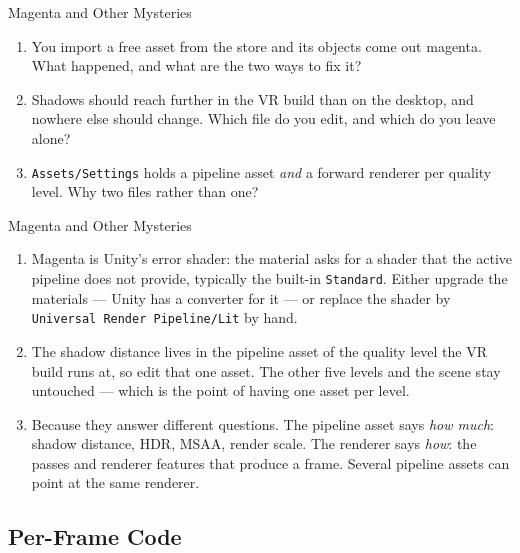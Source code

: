\begin{exerciseframe}{Magenta and Other Mysteries}
  \begin{enumerate}
    \item You import a free asset from the store and its objects come out
      magenta. What happened, and what are the two ways to fix it?
    \item Shadows should reach further in the VR build than on the desktop,
      and nowhere else should change. Which file do you edit, and which do you
      leave alone?
    \item \texttt{Assets/Settings} holds a pipeline asset \emph{and} a forward
      renderer per quality level. Why two files rather than one?
  \end{enumerate}
\end{exerciseframe}

\begin{solutionframe}{Magenta and Other Mysteries}
  \begin{enumerate}
    \item Magenta is Unity's error shader: the material asks for a shader that
      the active pipeline does not provide, typically the built-in
      \texttt{Standard}. Either upgrade the materials --- Unity has a
      converter for it --- or replace the shader by
      \texttt{Universal Render Pipeline/Lit} by hand.
    \item The shadow distance lives in the pipeline asset of the quality level
      the VR build runs at, so edit that one asset. The other five levels and
      the scene stay untouched --- which is the point of having one asset per
      level.
    \item Because they answer different questions. The pipeline asset says
      \emph{how much}: shadow distance, HDR, MSAA, render scale. The renderer
      says \emph{how}: the passes and renderer features that produce a frame.
      Several pipeline assets can point at the same renderer.
  \end{enumerate}
\end{solutionframe}

\subsection{Per-Frame Code}

